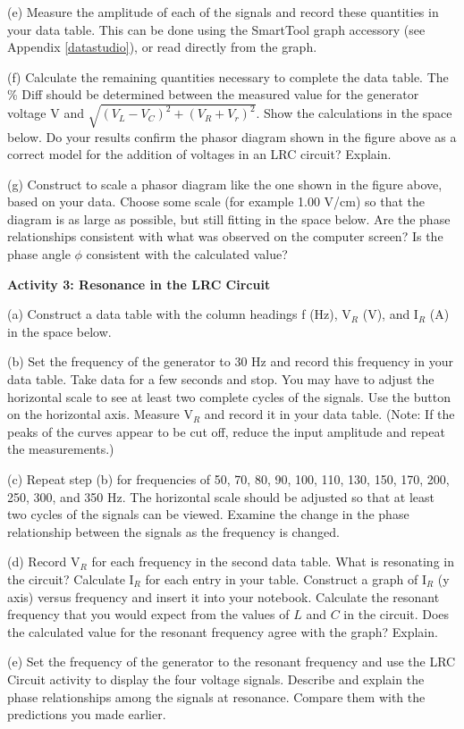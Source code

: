 (e) Measure the amplitude of each of the signals and record these
quantities in your data table. This can be done using the SmartTool graph
accessory (see Appendix \ref{datastudio}), or read directly from the graph.

(f) Calculate the remaining quantities necessary to complete the data
table. The \% Diff should be determined between the measured value
for the generator voltage V and \( \sqrt{(V_{L}-V_{C})^{2}+(V_{R}+V_{r})^{2}} \).
Show the calculations in the space below. Do your
results confirm the phasor diagram shown in the figure above as a
correct model for the addition of voltages in an LRC circuit? Explain.
\answerspace{3in}

(g) Construct to scale a phasor diagram like the one shown in the
figure above, based on your data. Choose some scale (for example
1.00 V/cm) so that the diagram is as large as possible, but still fitting 
in the space below. Are the phase relationships consistent
with what was observed on the computer screen? Is the phase angle
\( \phi  \) consistent with the calculated value?
\answerspace{2in}

\pagebreak
\textbf{Activity 3: Resonance in the LRC Circuit }

(a) Construct a data table with the column headings f (Hz),
V\( _{R} \) (V), and I\(_R \) (A) in the space below.
\vspace{3in}

(b) Set the frequency of the generator to 30 Hz and record this
frequency in your data table. Take data for a few seconds and stop. You may
have to adjust the horizontal scale to see at least two complete
cycles of the signals. Use the button on the horizontal axis.
Measure V\( _{R} \)  and record it in your data table. (Note: If the peaks 
of the curves appear
to be cut off, reduce the input amplitude and repeat the measurements.)

(c) Repeat step (b) for frequencies of 50, 70, 80, 90,
100, 110, 130, 150, 170, 200, 250, 300, and 350 Hz. The \textbf{}horizontal scale \textbf{}should
be adjusted so that at least two cycles of the signals can be viewed.
Examine the change in the phase relationship between the signals as
the frequency is changed. 

(d) Record V\( _{R} \)  for each
frequency in the second data table. What is resonating in the
circuit? Calculate I\(_R\) for each entry in your table.
Construct a graph of I\( _{R} \)
(y axis) versus frequency and insert it into your notebook. Calculate
the resonant frequency that you would expect from the values of $L$
and $C$ in the circuit. Does the calculated value for the resonant frequency
agree with the graph? Explain.
\vspace{40mm}

(e) Set the frequency of the generator to the resonant
frequency and use the LRC Circuit activity to display the
four voltage signals. Describe and explain the phase relationships
among the signals at resonance. Compare them with the predictions
you made earlier. \vspace{20mm}


